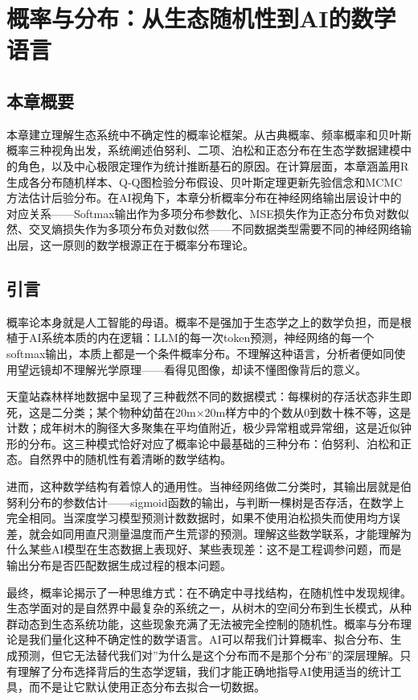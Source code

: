 \documentclass[
  twoside,12pt,fontset=none]{ctexbook}
\begin{document}
\hypertarget{ch02}{%
\chapter{概率与分布：从生态随机性到AI的数学语言}\label{ch02}}

\hypertarget{ux672cux7ae0ux6982ux8981-1}{%
\section{本章概要}\label{ux672cux7ae0ux6982ux8981-1}}

本章建立理解生态系统中不确定性的概率论框架。从古典概率、频率概率和贝叶斯概率三种视角出发，系统阐述伯努利、二项、泊松和正态分布在生态学数据建模中的角色，以及中心极限定理作为统计推断基石的原因。在计算层面，本章涵盖用R生成各分布随机样本、Q-Q图检验分布假设、贝叶斯定理更新先验信念和MCMC方法估计后验分布。在AI视角下，本章分析概率分布在神经网络输出层设计中的对应关系------Softmax输出作为多项分布参数化、MSE损失作为正态分布负对数似然、交叉熵损失作为多项分布负对数似然------不同数据类型需要不同的神经网络输出层，这一原则的数学根源正在于概率分布理论。

\hypertarget{ux5f15ux8a00-1}{%
\section{引言}\label{ux5f15ux8a00-1}}

概率论本身就是人工智能的母语。概率不是强加于生态学之上的数学负担，而是根植于AI系统本质的内在逻辑：LLM的每一次token预测，神经网络的每一个softmax输出，本质上都是一个条件概率分布。不理解这种语言，分析者便如同使用望远镜却不理解光学原理------看得见图像，却读不懂图像背后的意义。

天童站森林样地数据中呈现了三种截然不同的数据模式：每棵树的存活状态非生即死，这是二分类；某个物种幼苗在20m×20m样方中的个数从0到数十株不等，这是计数；成年树木的胸径大多聚集在平均值附近，极少异常粗或异常细，这是近似钟形的分布。这三种模式恰好对应了概率论中最基础的三种分布：伯努利、泊松和正态。自然界中的随机性有着清晰的数学结构。

进而，这种数学结构有着惊人的通用性。当神经网络做二分类时，其输出层就是伯努利分布的参数估计------sigmoid函数的输出，与判断一棵树是否存活，在数学上完全相同。当深度学习模型预测计数数据时，如果不使用泊松损失而使用均方误差，就会如同用直尺测量温度而产生荒谬的预测。理解这些数学联系，才能理解为什么某些AI模型在生态数据上表现好、某些表现差：这不是工程调参问题，而是输出分布是否匹配数据生成过程的根本问题。

最终，概率论揭示了一种思维方式：在不确定中寻找结构，在随机性中发现规律。生态学面对的是自然界中最复杂的系统之一，从树木的空间分布到生长模式，从种群动态到生态系统功能，这些现象充满了无法被完全控制的随机性。概率与分布理论是我们量化这种不确定性的数学语言。AI可以帮我们计算概率、拟合分布、生成预测，但它无法替代我们对''为什么是这个分布而不是那个分布''的深层理解。只有理解了分布选择背后的生态学逻辑，我们才能正确地指导AI使用适当的统计工具，而不是让它默认使用正态分布去拟合一切数据。
\end{document}
